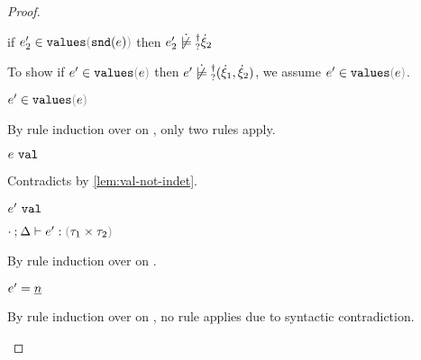 \begin{proof}
\begin{byCases}
\begin{byCases}
\begin{byCases}
\begin{byCases}
\begin{byCases}
\begin{pfsteps*}
            \item if $\inValues{e_2'}{\hsnd{e}}$ then $\cnotsatisfyormay{e_2'}{\hxi_2}$  
            \end{pfsteps*} 
            To show if $\inValues{e'}{e}$ then $\cnotsatisfyormay{e'}{\cpair{\hxi_1}{\hxi_2}}$, we assume $\inValues{e'}{e}$.
            \begin{pfsteps*}
            \item $\inValues{e'}{e}$  
            \end{pfsteps*}
            By rule induction over  on , only two rules apply.
            \begin{byCases}
              \item[\text{(\ref{rule:IVVal})}]
              \begin{pfsteps*}
              \item $e ~\mathtt{val}$ 
              \end{pfsteps*} 
              Contradicts  by \autoref{lem:val-not-indet}.
              \item[\text{(\ref{rule:IVIndet})}] 
              \begin{pfsteps*}
              \item $e' ~\mathtt{val}$  
              \item $\hexptyp{\cdot}{\Delta}{e'}{\tprod{\tau_1}{\tau_2}}$  
              \end{pfsteps*}
              By rule induction over  on .
              \begin{byCases}
                \item[\text{(\ref{rule:VNum})}]
                \begin{pfsteps*}
                \item $e'=\underline{n}$ 
                \end{pfsteps*} 
                By rule induction over  on , no rule applies due to syntactic contradiction.
                \item[\text{(\ref{rule:VLam})}]
                \begin{pfsteps*} 

\end{pfsteps*}
\end{byCases}
\end{byCases}
\end{byCases}
\end{byCases}
\end{byCases}
\end{byCases}
\end{byCases}
\end{proof}
